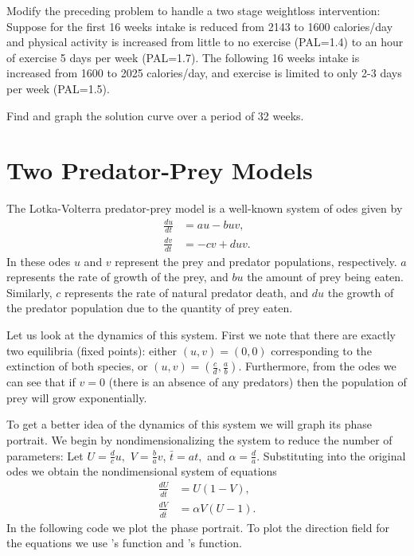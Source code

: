 \begin{problem}

Modify the preceding problem to handle a two stage weightloss intervention:
Suppose for the first 16 weeks intake is reduced from 2143 to 1600 calories/day and physical activity is increased from little to no exercise (PAL=1.4) to an hour of exercise 5 days per week (PAL=1.7). The following 16 weeks intake is increased from 1600 to 2025 calories/day, and exercise is limited to only 2-3 days per week (PAL=1.5).

Find and graph the solution curve over a period of 32 weeks.
\end{problem}

\section{Two Predator-Prey Models}
The Lotka-Volterra predator-prey model is a well-known 
system of odes given by 
\begin{align*}
	\frac{du}{dt} &= au - buv,\\
	\frac{dv}{dt} &= -cv + duv.
\end{align*}
In these odes $u$ and $v$ represent the prey and predator 
populations, respectively. $a$ represents the rate of growth 
of the prey, and $bu$ the amount of prey being eaten. 
Similarly, $c$ represents the rate of natural predator death, and $du$ the growth of the predator 
population due to the quantity of prey eaten.

Let us look at the dynamics of this system. First we note 
that there are exactly two equilibria (fixed points): either 
$(u,v) = (0,0)$ corresponding to the extinction of both 
species, or $(u,v) = (\frac{c}{d},\frac{a}{b})$.
 Furthermore, from the odes we can see that if $v=0$ (there
 is an absence of any predators) then the population of prey
 will grow exponentially.

To get a better idea of the dynamics of this system we will graph its phase portrait.
We begin by nondimensionalizing the system to reduce the number of parameters: 
Let $U = \frac{d}{c}u,$ $V = \frac{b}{a}v$, $\bar{t} = at,$ and  
$\alpha = \frac{d}{a}$. Substituting into the original odes we 
obtain the nondimensional system of equations
\begin{align*}
	\frac{dU}{d\bar{t}} &= U(1-V),\\
	\frac{dV}{d\bar{t}} &= \alpha V (U-1).
\end{align*}
In the following code we plot the phase portrait. To plot the direction field 
for the equations we use 's  function and 
's  function.

